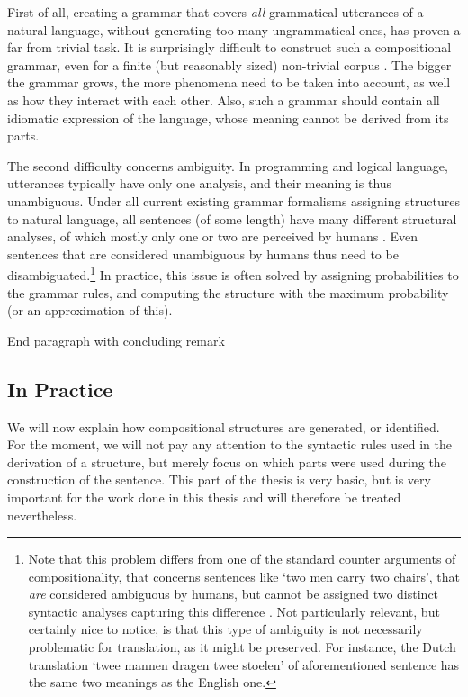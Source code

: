 \documentclass{report}
\theoremstyle{break}
\begin{document}
First of all, creating a grammar that covers \textit{all} grammatical utterances of a natural language, without generating too many ungrammatical ones, has proven a far from trivial task. It is surprisingly difficult to construct such a compositional grammar, even for a finite (but reasonably sized) non-trivial corpus \citep{scha1990taaltheorie}. The bigger the grammar grows, the more phenomena need to be taken into account, as well as how they interact with each other. Also, such a grammar should contain all idiomatic expression of the language, whose meaning cannot be derived from its parts.

The second difficulty concerns ambiguity. In programming and logical language, utterances typically have only one analysis, and their meaning is thus unambiguous. Under all current existing grammar formalisms assigning structures to natural language, all sentences (of some length) have many different structural analyses, of which mostly only one or two are perceived by humans \citep{scha1990taaltheorie}. Even sentences that are considered unambiguous by humans thus need to be disambiguated.\footnote{Note that this problem differs from one of the standard counter arguments of compositionality, that concerns sentences like `two men carry two chairs', that \textit{are} considered ambiguous by humans, but cannot be assigned two distinct syntactic analyses capturing this difference \citep{pelletier1994principle}. Not particularly relevant, but certainly nice to notice, is that this type of ambiguity is not necessarily problematic for translation, as it might be preserved. For instance, the Dutch translation `twee mannen dragen twee stoelen' of aforementioned sentence has the same two meanings as the English one.} In practice, this issue is often solved by assigning probabilities to the grammar rules, and computing the structure with the maximum probability (or an approximation of this).

End paragraph with concluding remark


\subsection{In Practice}

We will now explain how compositional structures are generated, or identified. For the moment, we will not pay any attention to the syntactic rules used in the derivation of a structure, but merely focus on which parts were used during the construction of the sentence. This part of the thesis is very basic, but is very important for the work done in this thesis and will therefore be treated nevertheless.
\end{document}
